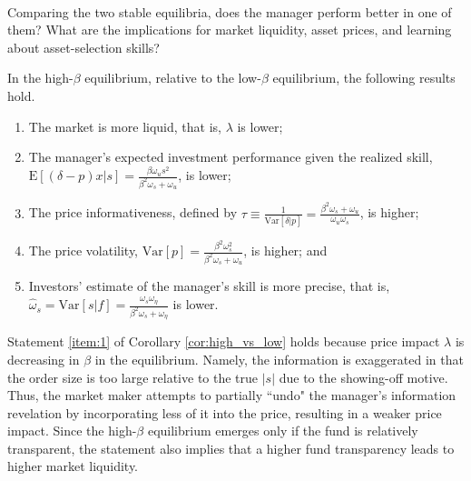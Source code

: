 \paragraph{}
Comparing the two stable equilibria, does the manager perform better in one of them? What are the implications for market liquidity, asset prices, and learning about asset-selection skills? 
\begin{corollary}\label{cor:high_vs_low}
In the high-$\beta$ equilibrium, relative to the low-$\beta$ equilibrium, the following results hold.
\begin{enumerate}[label=(\roman*)]
\item \label{item:1} The market is more liquid, that is, $\lambda$ is lower;
\item \label{item:2} The manager's expected investment performance given the realized skill, $\mathrm{E}[(\delta-p)x|s]=\frac{\beta\omega_{u}s^{2}}{\beta^{2} \omega_{s}+\omega_{u}}$, is lower;
\item \label{item:3} The price informativeness, defined by $\tau\equiv\frac{1}{\mathrm{Var}[\delta|p]}=\frac{\beta^{2} \omega_{s}+\omega_{u}}{\omega_{u} \omega_{s}}$, is higher;
\item \label{item:4} The price volatility, $\mathrm{Var}[p]=\frac{\beta^{2}\omega_{s}^{2}}{\beta^{2} \omega_{s}+\omega_{u}}$, is higher; and
\item \label{item:5} Investors' estimate of the manager's skill is more precise, that is, $\hat{\omega}_{s}=\mathrm{Var}[s|f] = \frac{\omega_{s}\omega_{\eta}}{\beta^{2}\omega_{s}+\omega_{\eta}}$ is lower.
\end{enumerate}
\end{corollary}

Statement \ref{item:1} of Corollary \ref{cor:high_vs_low} holds because price impact $\lambda$ is decreasing in $\beta$ in the equilibrium. Namely, the information is exaggerated in that the order size is too large relative to the true $|s|$ due to the showing-off motive. Thus, the market maker attempts to partially ``undo" the manager's information revelation by incorporating less of it into the price, resulting in a weaker price impact. Since the high-$\beta$ equilibrium emerges only if the fund is relatively transparent, the statement also implies that a higher fund transparency leads to higher market liquidity.

